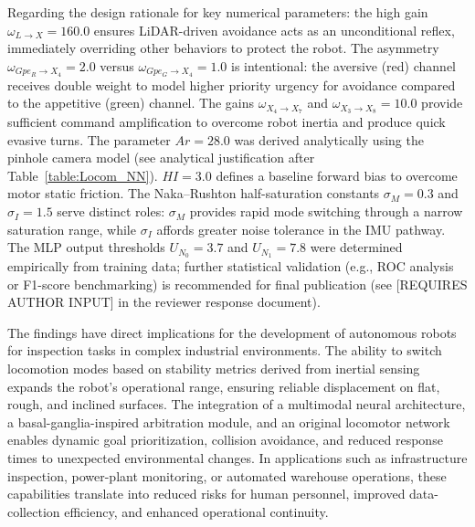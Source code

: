 \documentclass[preprint,12pt]{elsarticle}
\begin{document}
Regarding the design rationale for key numerical parameters: the high gain $\omega_{L\rightarrow X} = 160.0$ ensures LiDAR-driven avoidance acts as an unconditional reflex, immediately overriding other behaviors to protect the robot. The asymmetry $\omega_{Gpe_R\rightarrow X_4} = 2.0$ versus $\omega_{Gpe_G\rightarrow X_4} = 1.0$ is intentional: the aversive (red) channel receives double weight to model higher priority urgency for avoidance compared to the appetitive (green) channel. The gains $\omega_{X_4\rightarrow X_7}$ and $\omega_{X_3\rightarrow X_8} = 10.0$ provide sufficient command amplification to overcome robot inertia and produce quick evasive turns. %
The parameter $Ar = 28.0$ was derived analytically using the pinhole camera model (see analytical justification after Table~\ref{table:Locom_NN}). $HI = 3.0$ defines a baseline forward bias to overcome motor static friction. The Naka--Rushton half-saturation constants $\sigma_M = 0.3$ and $\sigma_I = 1.5$ serve distinct roles: $\sigma_M$ provides rapid mode switching through a narrow saturation range, while $\sigma_I$ affords greater noise tolerance in the IMU pathway. The MLP output thresholds $U_{N_0} = 3.7$ and $U_{N_1} = 7.8$ were determined empirically from training data; further statistical validation (e.g., ROC analysis or F1-score benchmarking) is recommended for final publication (see [REQUIRES AUTHOR INPUT] in the reviewer response document). 

The findings have direct implications for the development of autonomous robots for inspection tasks in complex industrial environments. The ability to switch locomotion modes based on stability metrics derived from inertial sensing expands the robot's operational range, ensuring reliable displacement on flat, rough, and inclined surfaces. The integration of a multimodal neural architecture, a basal-ganglia-inspired arbitration module, and an original locomotor network enables dynamic goal prioritization, collision avoidance, and reduced response times to unexpected environmental changes. In applications such as infrastructure inspection, power-plant monitoring, or automated warehouse operations, these capabilities translate into reduced risks for human personnel, improved data-collection efficiency, and enhanced operational continuity. 
\end{document}
